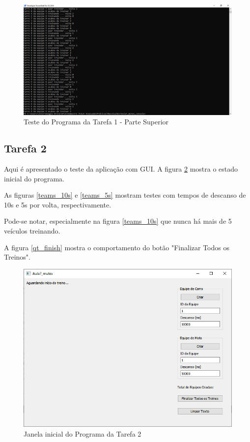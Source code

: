 \documentclass[12pt,a4paper]{article}
\begin{document}
\begin{figure}[H]
\centering
\includegraphics[width=\textwidth]{console_p2}
\caption{Teste do Programa da Tarefa 1 - Parte Superior}
\label{console_p2}
\end{figure}


\subsection*{Tarefa 2}
Aqui é apresentado o teste da aplicação com GUI. A figura \ref{qt_idle} mostra o estado inicial do programa. 

As figuras \ref{teams_10s} e \ref{teams_5s} mostram testes com tempos de descanso de 10s e 5s por volta, respectivamente. 

Pode-se notar, especialmente na figura \ref{teams_10s} que nunca há mais de 5 veículos treinando.


A figura \ref{qt_finish} mostra o comportamento do botão "Finalizar Todos os Treinos".
\begin{figure}[H]
\centering
\includegraphics[width=\textwidth]{qt_idle}
\caption{Janela inicial do Programa da Tarefa 2}
\label{qt_idle}
\end{figure}
\end{document}
